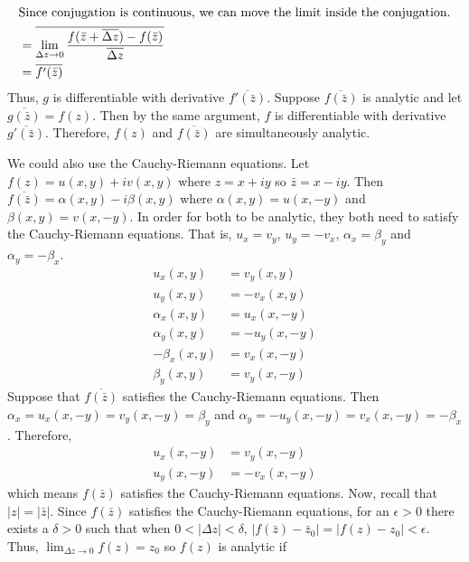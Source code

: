 \begin{enumerate}
\begin{align*}
    \intertext{Since conjugation is continuous, we can move the limit inside
    the conjugation.}
          & = \overline{\lim_{\Delta z\to 0}
            \frac{f(\bar{z} + \overline{\Delta z}) - f(\bar{z})}
            {\overline{\Delta z}}}\\
          & = \overline{f'(\bar{z})}
  \end{align*}
  Thus, \(g\) is differentiable with derivative \(\overline{f'(\bar{z})}\).
  Suppose \(\overline{f(\bar{z})}\) is analytic and let
  \(\overline{g(\bar{z})} = f(z)\).
  Then by the same argument, \(f\) is differentiable with derivative
  \(\overline{g'(\bar{z})}\).
  Therefore, \(f(z)\) and \(\overline{f(\bar{z})}\) are simultaneously
  analytic.
  \par\smallskip
  We could also use the Cauchy-Riemann equations.
  Let \(f(z) = u(x,y) + iv(x,y)\) where \(z = x + iy\) so \(\bar{z} = x - iy\).
  Then \(\overline{f(\bar{z})} = \alpha(x,y) - i\beta(x,y)\) where
  \(\alpha(x,y) = u(x,-y)\) and \(\beta(x,y) = v(x,-y)\).
  In order for both to be analytic, they both need to satisfy the
  Cauchy-Riemann equations.
  That is, \(u_x = v_y\), \(u_y = -v_x\), \(\alpha_x = \beta_y\) and
  \(\alpha_y = -\beta_x\).
  \begin{align*}
    u_x(x,y) & = v_y(x,y)\\
    u_y(x,y) & = -v_x(x,y)\\
    \alpha_x(x,y) & = u_x(x,-y)\\
    \alpha_y(x,y) & = -u_y(x,-y)\\
    -\beta_x(x,y) & = v_x(x,-y)\\
    \beta_y(x,y) & = v_y(x,-y)
  \end{align*}
  Suppose that \(\overline{f(\bar{z})}\) satisfies the Cauchy-Riemann
  equations.
  Then \(\alpha_x = u_x(x,-y) = v_y(x,-y) = \beta_y\) and
  \(\alpha_y = -u_y(x,-y) = v_x(x,-y) = -\beta_x\).
  Therefore,
  \begin{align*}
    u_x(x,-y) & = v_y(x,-y)\\
    u_y(x,-y) & = -v_x(x,-y)
  \end{align*}
  which means \(f(\bar{z})\) satisfies the Cauchy-Riemann equations.
  Now, recall that \(\lvert z\rvert = \lvert\bar{z}\rvert\).
  Since \(f(\bar{z})\) satisfies the Cauchy-Riemann equations, for an
  \(\epsilon > 0\) there exists a \(\delta > 0\) such that when 
  \(0 < \lvert\Delta z\rvert < \delta\),
  \(\lvert f(\bar{z}) - \bar{z}_0\rvert = \lvert f(z) - z_0\rvert < \epsilon\).
  Thus, \(\lim_{\Delta z\to 0}f(z) = z_0\) so \(f(z)\) is analytic if

\end{enumerate}
